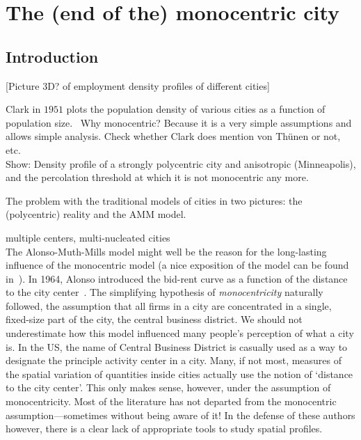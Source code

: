 %
\chapter{The (end of the) monocentric city}
\label{chap:monocentric_introduction}


\section{Introduction}
\label{sec:introduction}

[Picture 3D? of employment density profiles of different cities]

Clark in $1951$ plots the population density of various cities as a function of
population size.~\cite{Clark:1951}
Why monocentric? Because it is a very simple assumptions and allows simple
analysis. Check whether Clark does mention von Th\"unen or not, etc.\\


Show: Density profile of a strongly polycentric city and anisotropic
(Minneapolis), and the percolation threshold at which it is not monocentric any
more.

The problem with the traditional models of cities in two pictures: the
(polycentric) reality and the AMM model.

\cite{Harris:1945} multiple centers, multi-nucleated cities\\

The Alonso-Muth-Mills model might well be the reason for the long-lasting influence of
the monocentric model (a nice exposition of the model can be found
in~\cite{Fujita:1989}). In 1964, Alonso introduced the bid-rent curve as a
function of the distance to the city center~\cite{Alonso:1964}. The simplifying hypothesis of
\emph{monocentricity} naturally followed, the assumption that all firms in a
city are concentrated in a single, fixed-size part of the city, the central business
district. We should not underestimate how this model influenced many people's
perception of what a city is. In the US, the name of Central Business District
is casually used as a way to designate the principle activity center in a city.
Many, if not most, measures of the spatial variation of quantities inside cities
actually use the notion of `distance to the city center'. This only makes sense,
however, under the assumption of monocentricity. Most of the
literature has not departed from the monocentric assumption---sometimes without
being aware of it! In the defense of these authors however, there is a clear
lack of appropriate tools to study spatial profiles.


